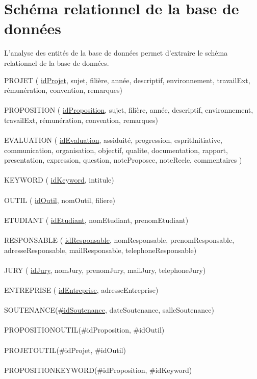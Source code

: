 \documentclass[a4paper,11pt]{report}
\begin{document}
\section{Schéma relationnel de la base de données}

\normalsize{
L'analyse des entités de la base de données permet d'extraire le schéma relationnel de la base de données. \\
}

\normalsize{
\noindent
PROJET ( \underline{idProjet}, sujet, filière, année, descriptif, environnement, travailExt, rémunération, convention, remarques)\\ \\
PROPOSITION ( \underline{idProposition}, sujet, filière, année, descriptif, environnement, travailExt, rémunération, convention, remarques)\\ \\
EVALUATION ( \underline{idEvaluation}, assiduité, progression, espritInitiative, communication, organisation, objectif, qualite, documentation, rapport, presentation, expression, question, noteProposee, noteReele, commentaires ) \\ \\
KEYWORD ( \underline{idKeyword}, intitule)\\ \\
OUTIL ( \underline{idOutil}, nomOutil, filiere)\\ \\
ETUDIANT ( \underline{idEtudiant}, nomEtudiant, prenomEtudiant)\\ \\
RESPONSABLE ( \underline{idResponsable}, nomResponsable, prenomResponsable, adresseResponsable, mailResponsable, telephoneResponsable)\\ \\
JURY ( \underline{idJury}, nomJury, prenomJury, mailJury, telephoneJury)\\ \\
ENTREPRISE ( \underline{idEntreprise}, adresseEntreprise)\\ \\
SOUTENANCE(\underline{\#idSoutenance}, dateSoutenance, salleSoutenance) \\ \\
PROPOSITIONOUTIL(\#idProposition, \#idOutil) \\ \\
PROJETOUTIL(\#idProjet, \#idOutil) \\ \\
PROPOSITIONKEYWORD(\#idProposition, \#idKeyword) \\ \\
}
\end{document}
